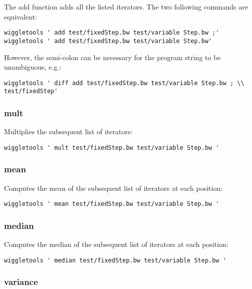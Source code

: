 \documentclass[12pt]{article}
\begin{document}
The add function adds all the listed iterators. The two following commands are equivalent:

\begin{verbatim}
wiggletools ' add test/fixedStep.bw test/variable Step.bw ;'
wiggletools ' add test/fixedStep.bw test/variable Step.bw'
\end{verbatim}

However, the semi-colon can be necessary for the program string to be unambiguous, e.g.:

\begin{verbatim}
wiggletools ' diff add test/fixedStep.bw test/variable Step.bw ; \\
test/fixedStep'
\end{verbatim}

\subsubsection{mult}

Multiplies the subsequent list of iterators:

\begin{verbatim}
wiggletools ' mult test/fixedStep.bw test/variable Step.bw '
\end{verbatim}

\subsubsection{mean}

Computes the mean of the subsequent list of iterators at each position:

\begin{verbatim}
wiggletools ' mean test/fixedStep.bw test/variable Step.bw '
\end{verbatim}

\subsubsection{median}

Computes the median of the subsequent list of iterators at each position:

\begin{verbatim}
wiggletools ' median test/fixedStep.bw test/variable Step.bw '
\end{verbatim}

\subsubsection{variance}
\end{document}
